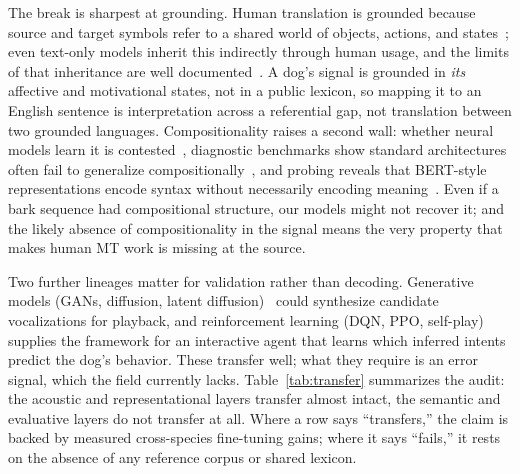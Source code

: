 The break is sharpest at grounding. Human translation is grounded because
source and target symbols refer to a shared world of objects, actions, and
states~\cite{harnad1990grounding}; even text-only models inherit this
indirectly through human usage, and the limits of that inheritance are well
documented~\cite{bisk2020experience}. A dog's signal is grounded in
\emph{its} affective and motivational states, not in a public lexicon, so
mapping it to an English sentence is interpretation across a referential
gap, not translation between two grounded languages. Compositionality
raises a second wall: whether neural models learn it is
contested~\cite{hupkes2020compositionality}, diagnostic benchmarks show
standard architectures often fail to generalize
compositionally~\cite{lake2018scan,lake2023systematic}, and probing reveals
that BERT-style representations encode syntax without necessarily encoding
meaning~\cite{conneau2018cram,rogers2020bertology}. Even if a bark sequence
had compositional structure, our models might not recover it; and the
likely absence of compositionality in the signal means the very property
that makes human MT work is missing at the source.

Two further lineages matter for validation rather than decoding.
Generative models (GANs, diffusion, latent
diffusion)~\cite{goodfellow2014gan,ho2020ddpm,rombach2022ldm} could
synthesize candidate vocalizations for playback, and reinforcement learning
(DQN, PPO, self-play)~\cite{mnih2015dqn,schulman2017ppo,silver2016alphago}
supplies the framework for an interactive agent that learns which inferred
intents predict the dog's behavior. These transfer well; what they require
is an error signal, which the field currently lacks.
Table~\ref{tab:transfer} summarizes the audit: the acoustic and
representational layers transfer almost intact, the semantic and evaluative
layers do not transfer at all. Where a row says ``transfers,'' the claim is
backed by measured cross-species fine-tuning gains; where it says ``fails,''
it rests on the absence of any reference corpus or shared lexicon.

